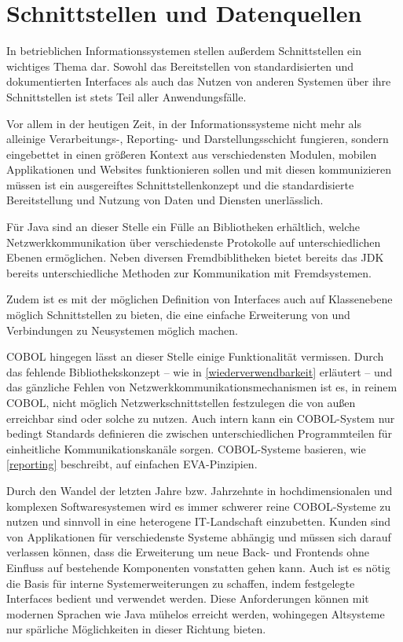 \section{Schnittstellen und Datenquellen}
In betrieblichen Informationssystemen stellen außerdem Schnittstellen ein wichtiges Thema dar. Sowohl das Bereitstellen von standardisierten und dokumentierten Interfaces als auch das Nutzen von anderen Systemen über ihre Schnittstellen ist stets Teil aller Anwendungsfälle. 

Vor allem in der heutigen Zeit, in der Informationssysteme nicht mehr als alleinige Verarbeitungs-, Reporting- und Darstellungsschicht fungieren, sondern eingebettet in einen größeren Kontext aus verschiedensten Modulen, mobilen Applikationen und Websites funktionieren sollen und mit diesen kommunizieren müssen ist ein ausgereiftes Schnittstellenkonzept und die standardisierte Bereitstellung und Nutzung von Daten und Diensten unerlässlich.

Für Java sind an dieser Stelle ein Fülle an Bibliotheken erhältlich, welche Netzwerkkommunikation über verschiedenste Protokolle auf unterschiedlichen Ebenen ermöglichen. Neben diversen Fremdbiblitheken bietet bereits das JDK bereits unterschiedliche Methoden zur Kommunikation mit Fremdsystemen.

Zudem ist es mit der möglichen Definition von Interfaces auch auf Klassenebene möglich Schnittstellen zu bieten, die eine einfache Erweiterung von und Verbindungen zu Neusystemen möglich machen.

COBOL hingegen lässt an dieser Stelle einige Funktionalität vermissen. Durch das fehlende Bibliothekskonzept -- wie in \autoref{wiederverwendbarkeit} erläutert -- und das gänzliche Fehlen von Netzwerkkommunikationsmechanismen ist es, in reinem COBOL, nicht möglich Netzwerkschnittstellen festzulegen die von außen erreichbar sind oder solche zu nutzen. Auch intern kann ein COBOL-System nur bedingt Standards definieren die zwischen unterschiedlichen Programmteilen für einheitliche Kommunikationskanäle sorgen. COBOL-Systeme basieren, wie \autoref{reporting} beschreibt, auf einfachen EVA-Pinzipien.

Durch den Wandel der letzten Jahre bzw. Jahrzehnte in hochdimensionalen und komplexen Softwaresystemen wird es immer schwerer reine COBOL-Systeme zu nutzen und sinnvoll in eine heterogene IT-Landschaft einzubetten. Kunden sind von Applikationen für verschiedenste Systeme abhängig und müssen sich darauf verlassen können, dass die Erweiterung um neue Back- und Frontends ohne Einfluss auf bestehende Komponenten vonstatten gehen kann. Auch ist es nötig die Basis für interne Systemerweiterungen zu schaffen, indem festgelegte Interfaces bedient und verwendet werden. Diese Anforderungen können mit modernen Sprachen wie Java mühelos erreicht werden, wohingegen Altsysteme nur spärliche Möglichkeiten in dieser Richtung bieten.